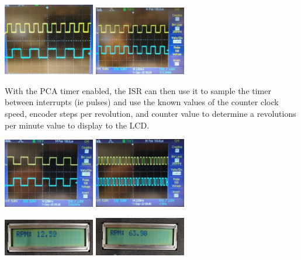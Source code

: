 \documentclass[11pt]{article}
\begin{document}
\begin{preview}
        \begin{center}
            \includegraphics[width=0.3\textwidth]{inc/edge_single.jpg}
            \includegraphics[width=0.3\textwidth]{inc/edged_double.jpg}
        \end{center}

        With the PCA timer enabled, the ISR can then use it to sample the timer between interrupts (ie pulses) and use the known values of the counter clock speed, encoder steps per revolution, and counter value to determine a revolutions per minute value to display to the LCD.

        \begin{center}
            \includegraphics[width=0.3\textwidth]{inc/pulse_low.jpg}
            \includegraphics[width=0.3\textwidth]{inc/pulse_high.jpg}
            
            \includegraphics[width=0.3\textwidth]{inc/rpm_low.jpg}
            \includegraphics[width=0.3\textwidth]{inc/rpm_high.jpg}
        \end{center}



\end{preview}
\end{document}
